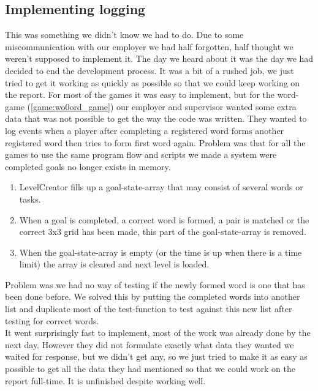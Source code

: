 \subsection{Implementing logging}
This was something we didn't know we had to do. Due to some miscommunication with our employer we had half forgotten, half thought we weren't supposed to implement it. The day we heard about it was the day we had decided to end the development process. It was a bit of a rushed job, we just tried to get it working as quickly as possible so that we could keep working on the report. For most of the games it was easy to implement, but for the word-game (\ref{game:wo0ord_game}) our employer and supervisor wanted some extra data that was not possible to get the way the code was written. They wanted to log events when a player after completing a registered word forms another registered word  then tries to form first word again. Problem was that for all the games to use the same program flow and scripts we made a system were completed goals no longer exists in memory. 
\begin{enumerate}
	\item LevelCreator fills up a goal-state-array that may consist of several words or tasks.
	\item When a goal is completed, a correct word is formed, a pair is matched or the correct 3x3 grid has been made, this part of the goal-state-array is removed.
	\item When the goal-state-array is empty (or the time is up when there is a time limit) the array is cleared and next level is loaded.
\end{enumerate}
Problem was we had no way of testing if the newly formed word is one that has been done before. We solved this by putting the completed words into another list and duplicate most of the test-function to test against this new list after testing for correct words.\\ It went surprisingly fast to implement, most of the work was already done by the next day. However they did not formulate exactly what data they wanted we waited for response, but we didn't get any, so we just tried to make it as easy as possible to get all the data they had mentioned so that we could work on the report full-time. It is unfinished despite working well.

